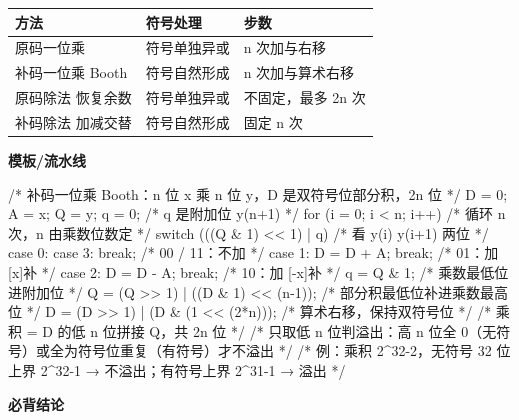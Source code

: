 \documentclass[10pt,a4paper]{ctexart}
\begin{document}
\begin{center}\small
\begin{tabularx}{\linewidth}{@{}>{\raggedright\arraybackslash}Xl>{\raggedright\arraybackslash}X@{}}
\toprule
方法 & 符号处理 & 步数 \\
\midrule
原码一位乘 & 符号单独异或 & n 次加与右移 \\
补码一位乘 Booth & 符号自然形成 & n 次加与算术右移 \\
原码除法 恢复余数 & 符号单独异或 & 不固定，最多 2n 次 \\
补码除法 加减交替 & 符号自然形成 & 固定 n 次 \\
\bottomrule
\end{tabularx}
\end{center}

\textbf{模板/流水线}

\begin{codebox}
/* 补码一位乘 Booth：n 位 x 乘 n 位 y，D 是双符号位部分积，2n 位 */
D = 0; A = x; Q = y; q = 0;             /* q 是附加位 y(n+1) */
for (i = 0; i < n; i++) {               /* 循环 n 次，n 由乘数位数定 */
    switch (((Q & 1) << 1) | q) {       /* 看 y(i) y(i+1) 两位 */
        case 0: case 3: break;          /* 00 / 11：不加 */
        case 1: D = D + A; break;       /* 01：加 [x]补 */
        case 2: D = D - A; break;       /* 10：加 [-x]补 */
    }
    q = Q & 1;                          /* 乘数最低位进附加位 */
    Q = (Q >> 1) | ((D & 1) << (n-1));  /* 部分积最低位补进乘数最高位 */
    D = (D >> 1) | (D & (1 << (2*n)));  /* 算术右移，保持双符号位 */
}
/* 乘积 = D 的低 n 位拼接 Q，共 2n 位 */
/* 只取低 n 位判溢出：高 n 位全 0（无符号）或全为符号位重复（有符号）才不溢出 */
/* 例：乘积 2^32-2，无符号 32 位上界 2^32-1 → 不溢出；有符号上界 2^31-1 → 溢出 */
\end{codebox}




\textbf{必背结论}
\end{document}
